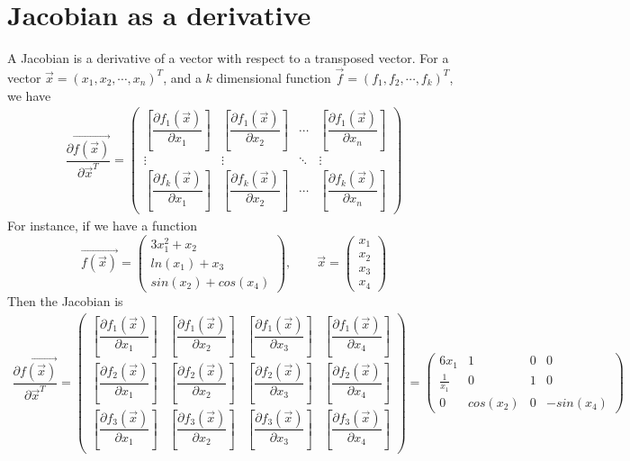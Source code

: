\documentclass[conference,final,11pt,technote,onecolumn]{IEEEtran}\usepackage[]{graphicx}\usepackage[]{color}
\begin{document}
\section{Jacobian as a derivative}
\label{term:Jacobian_as_a_derivative}
A Jacobian is a derivative of a vector with respect to a transposed vector. For a vector $\vec x = (x_1, x_2, \cdots, x_n)^T$, and a $k$ dimensional function $\vec f = (f_1, f_2, \cdots, f_k)^T$, we have
\begin{eqnarray}
\nonumber \dfrac{\partial \overrightarrow{f(\vec{x})}}{\partial \vec x^T} = \begin{pmatrix}
\left[ \dfrac{\partial f_1(\vec x)}{\partial x_1}\right] & \left[ \dfrac{\partial f_1(\vec x)}{\partial x_2}\right] & \cdots & \left[ \dfrac{\partial f_1(\vec x)}{\partial x_n}\right]\\
\vdots & \vdots & \ddots & \vdots \\
\left[ \dfrac{\partial f_k(\vec x)}{\partial x_1}\right] & \left[ \dfrac{\partial f_k(\vec x)}{\partial x_2}\right] & \cdots & \left[ \dfrac{\partial f_k(\vec x)}{\partial x_n}\right]
\end{pmatrix}
\end{eqnarray}
For instance, if we have a function 
\[ 
\overrightarrow{f(\vec x)} = \begin{pmatrix}
3x^2_1 + x_2\\
ln(x_1) + x_3\\
sin(x_2) + cos(x_4)
\end{pmatrix}, \qquad \vec x= \begin{pmatrix}
x_1\\x_2\\x_3\\x_4
\end{pmatrix}
\]
Then the Jacobian is
\begin{eqnarray}
\nonumber \dfrac{\partial \overrightarrow{f(\vec{x})}}{\partial \vec x^T} = \begin{pmatrix}
\left[ \dfrac{\partial f_1(\vec x)}{\partial x_1}\right] & \left[ \dfrac{\partial f_1(\vec x)}{\partial x_2}\right] & \left[ \dfrac{\partial f_1(\vec x)}{\partial x_3}\right] & \left[ \dfrac{\partial f_1(\vec x)}{\partial x_4}\right]\\
\left[ \dfrac{\partial f_2(\vec x)}{\partial x_1}\right] & \left[ \dfrac{\partial f_2(\vec x)}{\partial x_2}\right] & \left[ \dfrac{\partial f_2(\vec x)}{\partial x_3}\right] & \left[ \dfrac{\partial f_2(\vec x)}{\partial x_4}\right]\\
\left[ \dfrac{\partial f_3(\vec x)}{\partial x_1}\right] & \left[ \dfrac{\partial f_3(\vec x)}{\partial x_2}\right] & \left[ \dfrac{\partial f_3(\vec x)}{\partial x_3}\right] & \left[ \dfrac{\partial f_3(\vec x)}{\partial x_4}\right] 
\end{pmatrix} = \begin{pmatrix}
6x_1 & 1 & 0 & 0\\
\frac{1}{x_1} & 0 & 1 & 0\\
0 & cos(x_2) & 0 & -sin(x_4)
\end{pmatrix}
\end{eqnarray}
\end{document}
